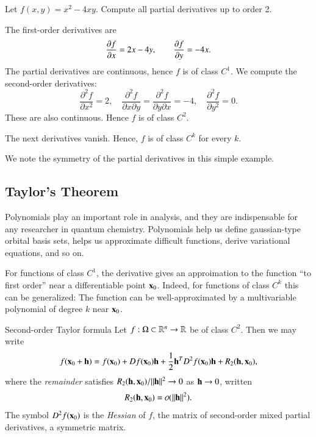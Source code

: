 \begin{myExample}{}{}
Let $f(x,y) = x^2 - 4xy$. Compute all partial derivatives up to order 2.

The first-order derivatives are
\begin{equation}
    \frac{\partial f}{\partial x} = 2x - 4y, \qquad \frac{\partial f}{\partial y} = -4x.
\end{equation}
The partial derivatives are continuous, hence $f$ is of class $C^1$. We compute the second-order derivatives:
\begin{equation}
    \frac{\partial^2 f}{\partial x^2} = 2, \quad \frac{\partial^2 f}{\partial x\partial y} = \frac{\partial^2 f}{\partial y\partial x} = -4, \quad \frac{\partial^2 f}{\partial y^2} = 0.
\end{equation}
These are also continuous. Hence $f$ is of class $C^2$.

The next derivatives vanish. Hence, $f$ is of class $C^k$ for every $k$.

We note the symmetry of the partial derivatives in this simple example.
\end{myExample}

\subsection{Taylor's Theorem}

Polynomials play an important role in analysis, and they are indispensable for any researcher in quantum chemistry. Polynomials help us define gaussian-type orbital basis sets, helps us approximate difficult functions, derive variational equations, and so on.

For functions of class $C^1$, the derivative gives an approimation to the function ``to first order'' near a differentiable point $\mathbf{x}_0$. Indeed, for functions of class $C^k$ this can be generalized: The function can be well-approximated by a multivariable polynomial of degree $k$ near $\mathbf{x}_0$.

\begin{myTheorem}{Second-order Taylor formula}
    Let $f : \Omega \subset \mathbb{R}^n \to \mathbb{R}$ be of class $C^2$. Then we may write
    \begin{equation}
        f(\mathbf{x}_0 + \mathbf{h}) = f(\mathbf{x}_0) + Df(\mathbf{x}_0)\mathbf{h} + \frac{1}{2} \mathbf{h}^T D^2 f(\mathbf{x}_0) \mathbf{h} + R_2(\mathbf{h},\mathbf{x}_0),
    \end{equation}
    where the \emph{remainder} satisfies $R_2(\mathbf{h},\mathbf{x}_0)/\|\mathbf{h}\|^2 \to 0$ as $\mathbf{h}\to 0$, written
    \begin{equation}
    R_2(\bvec{h},\bvec{x}_0) = \smallO(\|\bvec{h}\|^2).
    \end{equation}
    The symbol $D^2 f(\mathbf{x}_0)$ is the \emph{Hessian} of $f$, the matrix of second-order mixed partial derivatives, a symmetric matrix.
\end{myTheorem}

